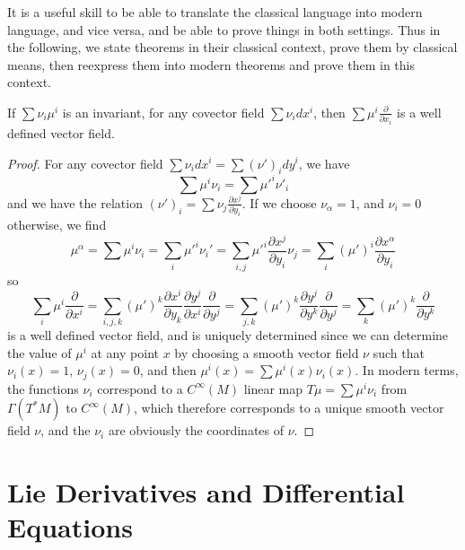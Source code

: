 It is a useful skill to be able to translate the classical language into modern language, and vice versa, and be able to prove things in both settings. Thus in the following, we state theorems in their classical context, prove them by classical means, then reexpress them into modern theorems and prove them in this context.

\begin{theorem}
    If $\sum \nu_i \mu^i$ is an invariant, for any covector field $\sum \nu_i dx^i$, then $\sum \mu^i \frac{\partial}{\partial x_i}$ is a well defined vector field.
\end{theorem}
\begin{proof}
    For any covector field $\sum \nu_i dx^i = \sum (\nu')_i dy^i$, we have
    \[ \sum \mu^i \nu_i = \sum \mu'^i \nu'_i \]
    and we have the relation $(\nu')_i = \sum \nu_j \frac{\partial x^j}{\partial y_i}$. If we choose $\nu_\alpha = 1$, and $\nu_i = 0$ otherwise, we find
    \[ \mu^\alpha = \sum \mu^i \nu_i = \sum_i \mu'^i \nu_i' = \sum_{i,j} \mu'^i \frac{\partial x^j}{\partial y_i} \nu_j = \sum_i (\mu')^i \frac{\partial x^\alpha}{\partial y_i} \]
    so
    \[ \sum_i \mu^i \frac{\partial}{\partial x^i} = \sum_{i,j,k} (\mu')^k \frac{\partial x^i}{\partial y_k} \frac{\partial y^j}{\partial x^i} \frac{\partial}{\partial y^j} = \sum_{j,k} (\mu')^k \frac{\partial y^j}{\partial y^k} \frac{\partial}{\partial y^j} = \sum_k (\mu')^k \frac{\partial}{\partial y^k} \]
    is a well defined vector field, and is uniquely determined since we can determine the value of $\mu^i$ at any point $x$ by choosing a smooth vector field $\nu$ such that $\nu_i(x) = 1$, $\nu_j(x) = 0$, and then $\mu^i(x) = \sum \mu^i(x) \nu_i(x)$. In modern terms, the functions $\nu_i$ correspond to a $C^\infty(M)$ linear map $T\mu = \sum \mu^i \nu_i$ from $\Gamma(T^*M)$ to $C^\infty(M)$, which therefore corresponds to a unique smooth vector field $\nu$, and the $\nu_i$ are obviously the coordinates of $\nu$.
\end{proof}









\chapter{Lie Derivatives and Differential Equations}

